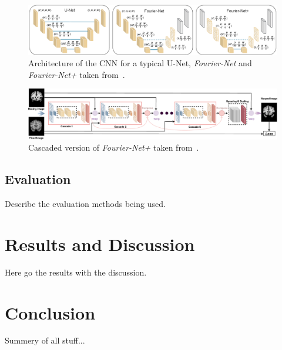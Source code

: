 \documentclass[english,version-2022-01]{uzl-thesis} %
\begin{document}
\begin{figure}[htpb]
	\centering
	\graphicspath{{images/}{\main/images/}}
	\includegraphics[width=\linewidth]{ArchitectureFourier-Net+CNN.png} 
	\caption{Architecture of the CNN for a typical U-Net, \emph{Fourier-Net} and \emph{Fourier-Net+} taken from~\cite{Fourier-Net+}.}
	\label{fig:Fourier-Net+CNN}
\end{figure}

\begin{figure}[htpb]
	\centering
	\graphicspath{{images/}{\main/images/}}
	\includegraphics[width=\linewidth]{ArchitectureFourier-Net+Cascaded.png} 
	\caption{Cascaded version of \emph{Fourier-Net+} taken from~\cite{Fourier-Net+}.}
	\label{fig:Fourier-Net+Cascaded}
\end{figure}

\section{Evaluation}
Describe the evaluation methods being used.



\chapter{Results and Discussion}
Here go the results with the discussion.



\chapter{Conclusion}
Summery of all stuff...
\end{document}
